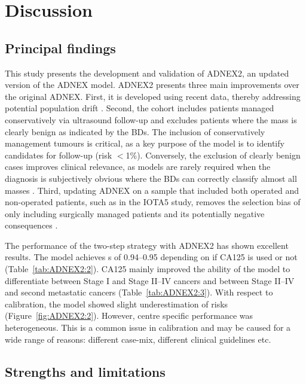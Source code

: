 \section{Discussion}

\subsection{Principal findings}

This study presents the development and validation of ADNEX2, an updated version of the \gls{ADNEX} model. ADNEX2 presents three main improvements over the original \gls{ADNEX}. First, it is developed using recent data, thereby addressing potential population drift \cite{vancalsterThereNoSuch2023}. Second, the cohort includes patients managed conservatively via ultrasound follow-up and excludes patients where the mass is clearly benign as indicated by the \glspl{BD}. The inclusion of conservatively management tumours is critical, as a key purpose of the model is to identify candidates for follow-up (risk $<$1\%). Conversely, the exclusion of clearly benign cases improves clinical relevance, as models are rarely required when the diagnosis is subjectively obvious where the \glspl{BD} can correctly classify almost all masses \cite{landolfoBenignDescriptorsADNEX2023}. Third, updating \gls{ADNEX} on a sample that included both operated and non-operated patients, such as in the \gls{IOTA}5 study, removes the selection bias of only including surgically managed patients and its potentially negative consequences \cite{timmermanIOTAPhase52025}.

The performance of the two-step strategy with ADNEX2 has shown excellent results. The model achieves s of 0.94--0.95 depending on if \gls{CA125} is used or not (Table~\ref{tab:ADNEX2:2}). \gls{CA125} mainly improved the ability of the model to differentiate between Stage I and Stage II--IV cancers and between Stage II--IV and second metastatic cancers (Table~\ref{tab:ADNEX2:3}). With respect to calibration, the model showed slight underestimation of risks (Figure~\ref{fig:ADNEX2:2}). However, centre specific performance was heterogeneous. This is a common issue in calibration \cite{vanAmsterdamCausalViewpoint2024, guptaDevelopmentValidationISARIC2021,steyerbergAssessmentHeterogeneityIndividual2019,vancalsterValidationModelsDiagnose2020}and may be caused for a wide range of reasons: different case-mix, different clinical guidelines etc.

\subsection{Strengths and limitations}

